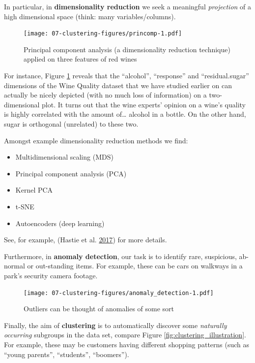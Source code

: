 \documentclass[10pt,b5paper,krantz1]{krantz}
\providecommand{\tightlist}{%
  \setlength{\itemsep}{0pt}\setlength{\parskip}{0pt}}
\begin{document}
In particular, in \textbf{dimensionality reduction} we seek a meaningful
\emph{projection} of a high dimensional
space (think: many variables/columns).

\begin{figure}
\hypertarget{fig:princomp}{%
\centering
\texttt{[image: 07-clustering-figures/princomp-1.pdf]}
\caption{Principal component analysis (a dimensionality reduction technique) applied on three features of red wines}\label{fig:princomp}
}
\end{figure}

For instance, Figure \ref{fig:princomp} reveals that the
``alcohol'', ``response'' and ``residual.sugar'' dimensions of the Wine Quality
dataset that we have studied earlier on can actually be nicely depicted (with
no much loss of information) on a two-dimensional plot.
It turns out that the wine experts' opinion on a wine's quality is highly
correlated with the amount of\ldots{} alcohol in a bottle.
On the other hand, sugar is orthogonal (unrelated) to these two.

Amongst example dimensionality reduction methods we find:

\begin{itemize}
\tightlist
\item
  Multidimensional scaling (MDS)
\item
  Principal component analysis (PCA)
\item
  Kernel PCA
\item
  t-SNE
\item
  Autoencoders (deep learning)
\end{itemize}

See, for example, (Hastie et al. \protect\hyperlink{ref-esl}{2017}) for more details.

\bigskip

Furthermore, in \textbf{anomaly detection}, our task is to identify rare, suspicious, ab-normal
or out-standing items.
For example, these can be cars on walkways in a park's security camera footage.

\begin{figure}
\hypertarget{fig:anomaly_detection}{%
\centering
\texttt{[image: 07-clustering-figures/anomaly\_detection-1.pdf]}
\caption{Outliers can be thought of anomalies of some sort}\label{fig:anomaly_detection}
}
\end{figure}

\bigskip

Finally, the aim of \textbf{clustering} is to automatically discover some \emph{naturally occurring}
subgroups in the data set, compare Figure \ref{fig:clustering_illustration}.
For example, these may be customers having different shopping patterns
(such as ``young parents'', ``students'', ``boomers'').
\end{document}
